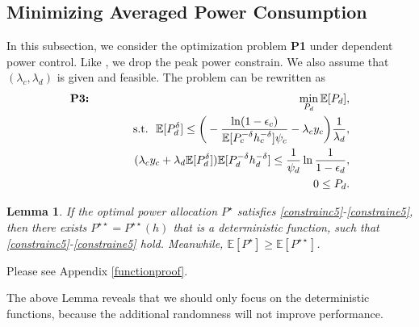 \documentclass[12pt, draftclsnofoot, journal, letterpaper, onecolumn]{IEEEtran}
\newtheorem{lemma}{Lemma}[section]
\begin{document}
\subsection{Minimizing Averaged Power Consumption}
In this subsection, we consider the optimization problem \textbf{P1} under dependent power control. Like \cite{FPC}, we drop the peak power constrain. We also assume that $(\lambda_c,\lambda_d)$ is given and feasible. The problem can be rewritten as
\begin{eqnarray}
\textbf{P3:}~&&\min_{P_d}\mathbb{E}[P_d],\label{max5}\\
  &&~ {\rm s.t.}~~\mathbb{E}[P_d^\delta]\leq \bigg(-\frac{\ln(1-\epsilon_c)}{\mathbb{E}[P_c^{-\delta}h_c^{-\delta}]\psi_c}-\lambda_cy_c\bigg)\frac{1}{\lambda_d},\label{constrainc5}\\
&&~~~~~~~~(\lambda_cy_c+\lambda_d\mathbb{E}[P_d^\delta])\mathbb{E}[P_d^{-\delta}h_d^{-\delta}]  \leq\frac{1}{\psi_d}\ln\frac{1}{1-\epsilon_d},\label{constraind5}\\
&&~~~~~~~~0\leq P_ d.\label{constraine5}
\end{eqnarray}

\begin{lemma}\label{function}
If the optimal power allocation $P^\star$ satisfies \eqref{constrainc5}-\eqref{constraine5}, then there exists $P^{\star\star}=P^{\star\star}(h)$ that is a deterministic function, such that \eqref{constrainc5}-\eqref{constraine5} hold. Meanwhile, $\mathbb{E}[P^\star]\geq\mathbb{E}[P^{\star\star}]$.
\end{lemma}

\begin{IEEEproof}
  Please see Appendix \ref{functionproof}.
\end{IEEEproof}

The above Lemma reveals that we should only focus on the deterministic functions, because the additional randomness will not improve performance.
\end{document}
